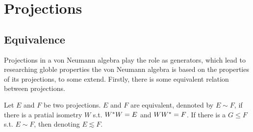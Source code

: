 \section{Projections}

\subsection{Equivalence}

Projections in a von Neumann algebra play the role as generators, which lead to researching globle properties the von Neumann algebra is based on the properties of its projections, to some extend. Firstly, there is some equivalent relation between projections.

\begin{defn}
	Let $E$ and $F$ be two projections. $E$ and $F$ are equivalent, dennoted by $E \sim F$, if there is a pratial isometry $W$ s.t. $W^{*}W = E$ and $WW^{*} = F$. If there is a $G \leqslant F$ s.t. $E \sim F$, then denoting $E \lesssim F$.
\end{defn}

















